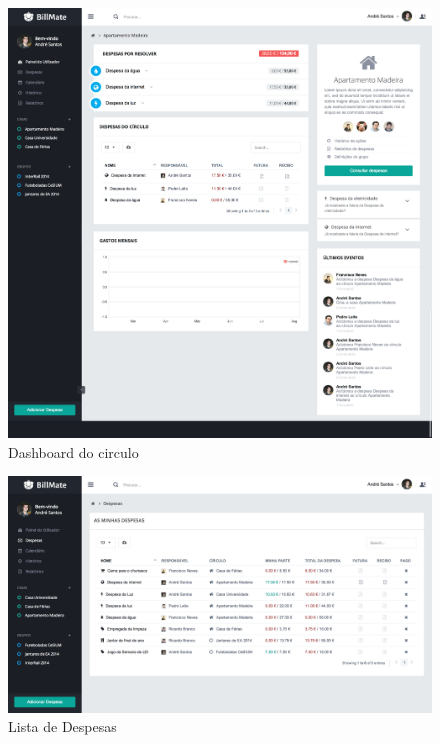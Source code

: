 \begin{referenciaswww}
\begin{figure}[ht]
{
\includegraphics[width=.5\textwidth]{images/andre/dashboard_circle}
\caption{Dashboard do circulo}
}
\end{figure}

\begin{figure}[ht]
{
\includegraphics[width=.5\textwidth]{images/andre/expenses}
\caption{Lista de Despesas}
}
\end{figure}


\end{referenciaswww}
